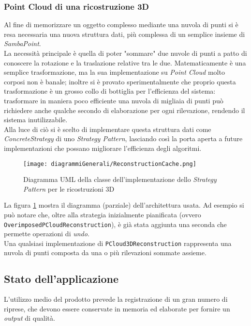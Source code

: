 \subsubsection{Point Cloud di una ricostruzione 3D}
Al fine di memorizzare un oggetto complesso mediante una nuvola di punti si è resa necessaria una nuova struttura dati, più complessa di un semplice insieme di \emph{SambaPoint}.\\
La necessità principale è quella di poter "sommare" due nuvole di punti a patto di conoscere la rotazione e la traslazione relative tra le due. Matematicamente è una semplice trasformazione, ma la sua implementazione su \emph{Point Cloud} molto corposi non è banale; inoltre si è provato sperimentalmente che proprio questa trasformazione è un grosso collo di bottiglia per l'efficienza del sistema: trasformare in maniera poco efficiente una nuvola di migliaia di punti può richiedere anche qualche secondo di elaborazione per ogni rilevazione, rendendo il sistema inutilizzabile.\\
Alla luce di ciò si è scelto di implementare questa struttura dati come \emph{ConcreteStrategy} di uno \emph{Strategy Pattern}, lasciando così la porta aperta a future implementazioni che possano migliorare l'efficienza degli algoritmi.
\begin{figure}[H] 
    \centering 
    \texttt{[image: diagrammiGenerali/ReconstructionCache.png]} 
    \caption{Diagramma UML della classe dell'implementazione dello \emph{Strategy Pattern} per le ricostruzioni 3D}
    \label{fig:reconstruction-strategy}
\end{figure}
La figura \ref{fig:reconstruction-strategy} mostra il diagramma (parziale) dell'architettura usata. Ad esempio si può notare che, oltre alla strategia inizialmente pianificata (ovvero \texttt{OverimposedPCloudReconstruction}), è già stata aggiunta una seconda che permette operazioni di \emph{undo}.\\
Una qualsiasi implementazione di \texttt{PCloud3DReconstruction} rappresenta una nuvola di punti composta da una o più rilevazioni sommate assieme.

\subsection{Stato dell'applicazione}
L'utilizzo medio del prodotto prevede la registrazione di un gran numero di riprese, che devono essere conservate in memoria ed elaborate per fornire un \emph{output} di qualità.

